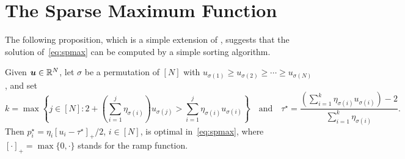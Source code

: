 \documentclass[11pt, a4paper, oneside, reqno]{article}
\begin{document}
	\section{The Sparse Maximum Function}
	\label{appendix:spmax}
	\renewcommand\thesection{\Alph{section}}
	The following proposition, which is a simple extension of \citep[Proposition~1]{sparsemax}, suggests that the solution of~\eqref{eq:spmax} can be computed by a simple sorting algorithm.
	\begin{proposition}
	\label{proposition:spmax}
	Given $\boldsymbol u\in\mathbb{R}^N$, let $\sigma$ be a permutation of $[N]$ with $u_{\sigma(1)} \geq u_{\sigma(2)} \geq \cdots \geq u_{\sigma(N)}$, and set
	$$k = \max \left\{ j \in [N]: 2 + \left( \sum_{i =1}^j \eta_{\sigma(i)} \right) u_{\sigma(j)} > \sum_{i =1}^j \eta_{\sigma(i)} u_{\sigma(i)} \right\}\quad \text{and} \quad \tau^\star = \frac{\left(\sum_{i=1}^k \eta_{\sigma(i)} u_{\sigma(i)}\right) - 2}{\sum_{i=1}^k \eta_{\sigma(i)}}.$$
	Then $p^\star_i =  \eta_i [u_i - \tau^\star]_+ / 2$, $i \in [N]$, is optimal in~\eqref{eq:spmax}, where $[\cdot]_+ = \max \{ 0, \cdot \}$ stands for the ramp function.
	\end{proposition}
\end{document}
